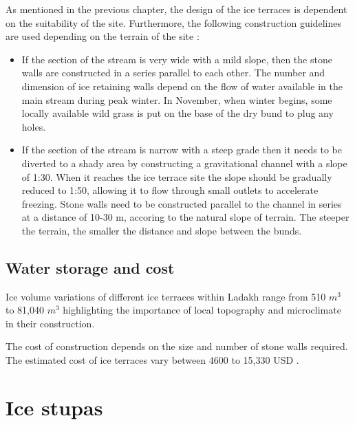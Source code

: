 As mentioned in the previous chapter, the design of the ice terraces is dependent on the suitability of the
site. Furthermore, the following construction guidelines are used depending on the terrain of the site
\cite{norphelandtashi}:

\begin{itemize}

  \item If the section of the stream is very wide with a mild slope, then the stone walls are
    constructed in a series parallel to each other. The number and dimension of ice retaining walls depend on
    the flow of water available in the main stream during peak winter. In November, when winter begins, some
    locally available wild grass is put on the base of the dry bund to plug any holes.

  \item If the section of the stream is narrow with a steep grade then it needs to be diverted to a shady area
    by constructing a gravitational channel with a slope of 1:30. When it reaches the ice terrace site the slope
    should be gradually reduced to 1:50, allowing it to flow through small outlets to accelerate freezing. Stone
    walls need to be constructed parallel to the channel in series at a distance of 10-30 m, accoring to the
    natural slope of terrain. The steeper the terrain, the smaller the distance and slope between the bunds.

\end{itemize}


\subsection{Water storage and cost}

Ice volume variations of different ice terraces within Ladakh \citep{nusserSociohydrologyArtificialGlaciers2019,
norphelandtashi} range from 510 $m^3$ to 81,040 $m^3$ highlighting the importance of local topography and
microclimate in their construction.

The cost of construction depends on the size and number of stone walls required. The estimated cost of ice
terraces vary between 4600 to 15,330 USD \cite{nusserSociohydrologyArtificialGlaciers2019}.

\section{Ice stupas}

